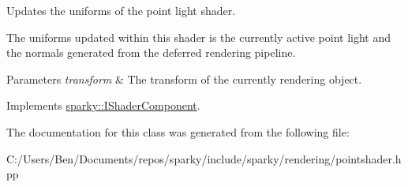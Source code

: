 Updates the uniforms of the point light shader. 

The uniforms updated within this shader is the currently active point light and the normals generated from the deferred rendering pipeline.


\begin{DoxyParams}{Parameters}
{\em transform} & The transform of the currently rendering object. \\
\hline
\end{DoxyParams}


Implements \hyperlink{classsparky_1_1_i_shader_component_a0bf4ef38fcf1ac17fd1852668baeef88}{sparky\+::\+I\+Shader\+Component}.



The documentation for this class was generated from the following file\+:\begin{DoxyCompactItemize}
\item 
C\+:/\+Users/\+Ben/\+Documents/repos/sparky/include/sparky/rendering/pointshader.\+hpp\end{DoxyCompactItemize}
